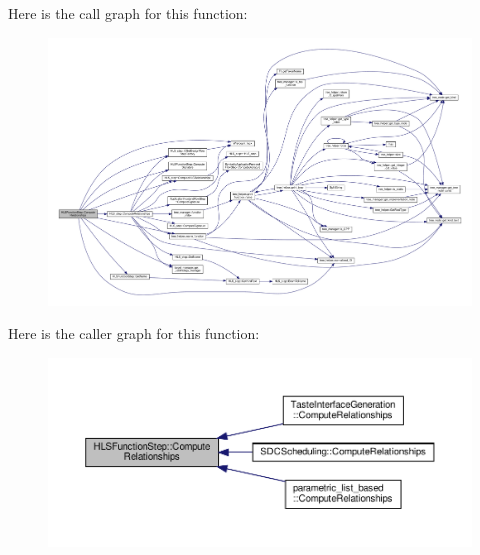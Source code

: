 Here is the call graph for this function\+:
\nopagebreak
\begin{figure}[H]
\begin{center}
\leavevmode
\includegraphics[width=350pt]{d9/d41/classHLSFunctionStep_ab3864e8dbd73b0eabc25f386a0cece54_cgraph}
\end{center}
\end{figure}
Here is the caller graph for this function\+:
\nopagebreak
\begin{figure}[H]
\begin{center}
\leavevmode
\includegraphics[width=350pt]{d9/d41/classHLSFunctionStep_ab3864e8dbd73b0eabc25f386a0cece54_icgraph}
\end{center}
\end{figure}
\mbox{\label{classHLSFunctionStep_ad9231528f2ec201d423ae69ac7db9719}} 
